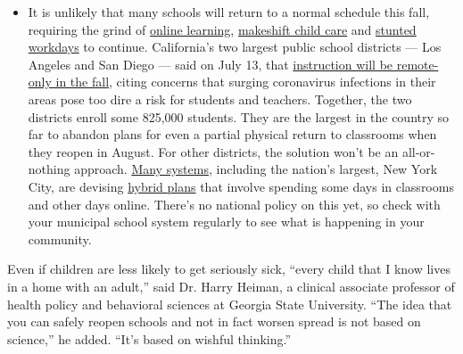\begin{itemize}
  \begin{itemize}
  \tightlist
  \item
    It is unlikely that many schools will return to a normal schedule
    this fall, requiring the grind of
    \href{https://www.nytimes3xbfgragh.onion/2020/06/05/us/coronavirus-education-lost-learning.html?action=click\&pgtype=Article\&state=default\&region=MAIN_CONTENT_3\&context=storylines_faq}{online
    learning},
    \href{https://www.nytimes3xbfgragh.onion/2020/05/29/us/coronavirus-child-care-centers.html?action=click\&pgtype=Article\&state=default\&region=MAIN_CONTENT_3\&context=storylines_faq}{makeshift
    child care} and
    \href{https://www.nytimes3xbfgragh.onion/2020/06/03/business/economy/coronavirus-working-women.html?action=click\&pgtype=Article\&state=default\&region=MAIN_CONTENT_3\&context=storylines_faq}{stunted
    workdays} to continue. California's two largest public school
    districts --- Los Angeles and San Diego --- said on July 13, that
    \href{https://www.nytimes3xbfgragh.onion/2020/07/13/us/lausd-san-diego-school-reopening.html?action=click\&pgtype=Article\&state=default\&region=MAIN_CONTENT_3\&context=storylines_faq}{instruction
    will be remote-only in the fall}, citing concerns that surging
    coronavirus infections in their areas pose too dire a risk for
    students and teachers. Together, the two districts enroll some
    825,000 students. They are the largest in the country so far to
    abandon plans for even a partial physical return to classrooms when
    they reopen in August. For other districts, the solution won't be an
    all-or-nothing approach.
    \href{https://bioethics.jhu.edu/research-and-outreach/projects/eschool-initiative/school-policy-tracker/}{Many
    systems}, including the nation's largest, New York City, are
    devising
    \href{https://www.nytimes3xbfgragh.onion/2020/06/26/us/coronavirus-schools-reopen-fall.html?action=click\&pgtype=Article\&state=default\&region=MAIN_CONTENT_3\&context=storylines_faq}{hybrid
    plans} that involve spending some days in classrooms and other days
    online. There's no national policy on this yet, so check with your
    municipal school system regularly to see what is happening in your
    community.
  \end{itemize}
\end{itemize}

Even if children are less likely to get seriously sick, ``every child
that I know lives in a home with an adult,'' said Dr. Harry Heiman, a
clinical associate professor of health policy and behavioral sciences at
Georgia State University. ``The idea that you can safely reopen schools
and not in fact worsen spread is not based on science,'' he added.
``It's based on wishful thinking.''

